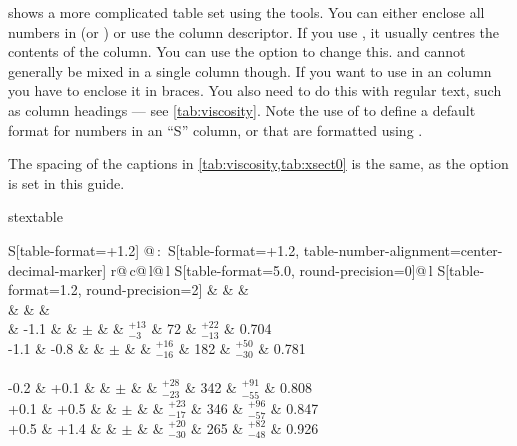  shows a more complicated table set using the tools.
You can either enclose all numbers in  (or )
or use the  column descriptor.
If you use , it usually centres the contents of the column.
You can use the  option to change this.
 and  cannot generally be mixed in a single column though.
If you want to use  in an
 column you have to enclose it in braces.
You also need to do this with regular text,
such as column headings --- see \cref{tab:viscosity}.
Note the use of 
to define a default format for numbers in an \enquote{S} column,
or that are formatted using .

The spacing of the captions in \cref{tab:viscosity,tab:xsect0} is the same,
as the option  is set in this guide.

\begin{table}[htbp]
\begin{tcblisting}{stextable}
\caption{A selection of cross-section measurements!
  Typeset using the  macro.}%
\label{tab:xsect0}
\centering
\renewcommand{\arraystretch}{1.2}
\begin{tabular}{
    S[table-format=+1.2] @{\,:\,}
    S[table-format=+1.2, table-number-alignment=center-decimal-marker]
    r@{\,}c@{\,}l@{\,}l
    S[table-format=5.0, round-precision=0]@{\,}l
    S[table-format=1.2, round-precision=2]}
  \toprule
   &  
  &  & \Cbhad \\
   &  &
   & \\
   & -1.1 &  &
  \(\pm\) &  &
  \(^{+13}_{-3}\) &  72 & \(^{+22}_{-13}\) & 0.704 \\
  -1.1 & -0.8 &  &
  \(\pm\) &  &
  \(^{+16}_{-16}\) & 182 & \(^{+50}_{-30}\) & 0.781 \\
  \\
  -0.2 & +0.1 &  &
  \(\pm\) &  &
  \(^{+28}_{-23}\) & 342 & \(^{+91}_{-55}\) & 0.808 \\
  +0.1 & +0.5 &  &
  \(\pm\) &  &
  \(^{+23}_{-17}\) & 346 & \(^{+96}_{-57}\) & 0.847 \\
  +0.5 & +1.4 &  &
  \(\pm\) &  &
  \(^{+20}_{-30}\) & 265 & \(^{+82}_{-48}\) & 0.926 \\
  \bottomrule
\end{tabular}
\end{tcblisting}
\end{table}

